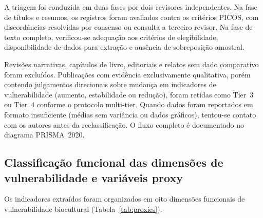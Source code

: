 \documentclass[12pt,a4paper]{article}
\begin{document}
A triagem foi conduzida em duas fases por dois revisores independentes. Na fase de títulos e resumos, os registros foram avaliados contra os critérios PICOS, com discordâncias resolvidas por consenso ou consulta a terceiro revisor. Na fase de texto completo, verificou-se adequação aos critérios de elegibilidade, disponibilidade de dados para extração e ausência de sobreposição amostral.

Revisões narrativas, capítulos de livro, editoriais e relatos sem dado comparativo foram excluídos. Publicações com evidência exclusivamente qualitativa, porém contendo julgamentos direcionais sobre mudança em indicadores de vulnerabilidade (aumento, estabilidade ou redução), foram retidas como Tier~3 ou Tier~4 conforme o protocolo multi-tier. Quando dados foram reportados em formato insuficiente (médias sem variância ou dados gráficos), tentou-se contato com os autores antes da reclassificação. O fluxo completo é documentado no diagrama PRISMA~2020.

\subsection{Classificação funcional das dimensões de vulnerabilidade e variáveis proxy}
\label{sec:dimensions}

Os indicadores extraídos foram organizados em oito dimensões funcionais de vulnerabilidade biocultural (Tabela~\ref{tab:proxies}).
\end{document}
